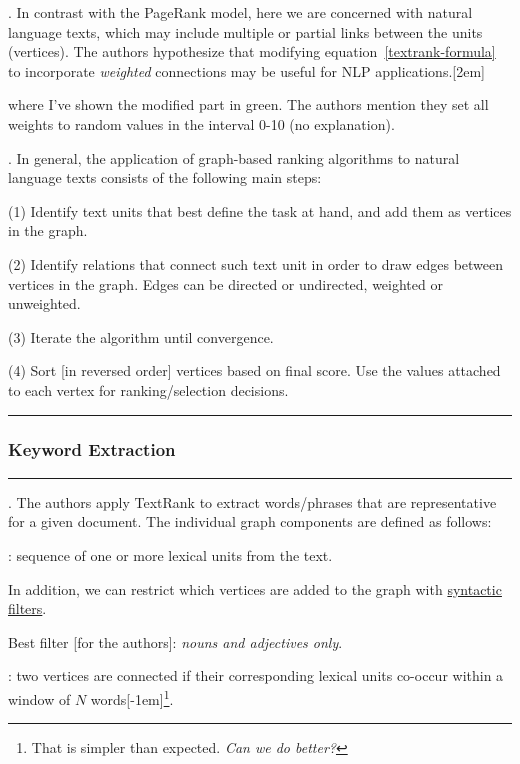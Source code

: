 \documentclass[11pt]{article}
\newcommand\myspace[1][]{\vspace{#1\bigskipamount}}
\newcommand\p{\Needspace{10\baselineskip} \noindent}
\newcommand\subsub[1]{\Needspace{15\baselineskip}\hrule\subsubsection{#1}\hrule}
\begin{document}
\myspace 
\p {}. In contrast with the PageRank model, here we are concerned with natural language texts, which may include multiple or partial links between the units (vertices). The authors hypothesize that modifying equation~\ref{textrank-formula} to incorporate \textit{weighted} connections may be useful for NLP applications.[2em]

where I've shown the modified part in green. The authors mention they set all weights to random values in the interval 0-10 (no explanation). 

\myspace
\p {}. In general, the application of graph-based ranking algorithms to natural language texts consists of the following main steps:
\begin{compactitem}
	\item[(1)] Identify text units that best define the task at hand, and add them as vertices in the graph.
	
	\item[(2)] Identify relations that connect such text unit in order to draw edges between vertices in the graph. Edges can be directed or undirected, weighted or unweighted.
	
	\item[(3)] Iterate the algorithm until convergence.\vspace{0.3em}
	
	\item[(4)] Sort [in reversed order] vertices based on final score. Use the values attached to each vertex for ranking/selection decisions.
\end{compactitem}

\myspace{}
\subsub{Keyword Extraction}
\myspace

\p {}. The authors apply TextRank to extract words/phrases that are representative for a given document. The individual graph components are defined as follows:
\begin{compactitem}[-]
	\item {}: sequence of one or more lexical units from the text.
	\begin{compactitem}
		\item In addition, we can restrict which vertices are added to the graph with \underline{syntactic filters}.
		\item Best filter [for the authors]: \textit{nouns and adjectives only}.
	\end{compactitem}
	\item {}: two vertices are connected if their corresponding lexical units co-occur within a window of $N$ words[-1em]\footnote{That is \textellipsis  simpler than expected. \textit{Can we do better?}}.
\end{compactitem}
\end{document}
